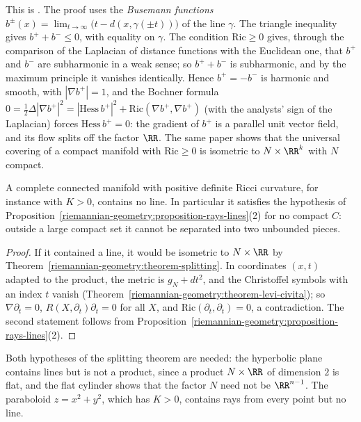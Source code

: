 This is \cite{cheeger-gromoll-1971}. The proof uses the \emph{Busemann functions} $b^\pm(x) = \lim_{t \to \infty}\bigl(t - d(x, \gamma(\pm t))\bigr)$ of the line $\gamma$. The
triangle inequality gives $b^+ + b^- \leq 0$, with equality on $\gamma$. The condition $\mathrm{Ric} \geq 0$ gives, through the comparison of the Laplacian of distance functions
with the Euclidean one, that $b^+$ and $b^-$ are subharmonic in a weak sense; so $b^+ + b^-$ is subharmonic, and by the maximum principle it vanishes identically. Hence
$b^+ = -b^-$ is harmonic and smooth, with $|\nabla b^+| = 1$, and the Bochner formula $0 = \frac12\Delta|\nabla b^+|^2 = |\mathrm{Hess}\,b^+|^2 + \mathrm{Ric}(\nabla b^+, \nabla b^+)$
(with the analysts' sign of the Laplacian) forces $\mathrm{Hess}\,b^+ = 0$: the gradient of $b^+$ is a parallel unit vector field, and its flow splits off the factor $\RR$.
The same paper shows that the universal covering of a compact manifold with $\mathrm{Ric} \geq 0$ is isometric to $N \times \RR^k$ with $N$ compact.

\begin{corollary}\label{riemannian-geometry:corollary-no-lines}
A complete connected manifold with positive definite Ricci curvature, for instance with $K > 0$, contains no line. In particular it satisfies the hypothesis of
Proposition~\ref{riemannian-geometry:proposition-rays-lines}(2) for no compact $C$: outside a large compact set it cannot be separated into two unbounded pieces.
\end{corollary}

\begin{proof}
If it contained a line, it would be isometric to $N \times \RR$ by Theorem~\ref{riemannian-geometry:theorem-splitting}. In coordinates $(x, t)$ adapted to the product, the
metric is $g_N + dt^2$, and the Christoffel symbols with an index $t$ vanish (Theorem~\ref{riemannian-geometry:theorem-levi-civita}); so $\nabla\partial_t = 0$,
$R(X, \partial_t)\partial_t = 0$ for all $X$, and $\mathrm{Ric}(\partial_t, \partial_t) = 0$, a contradiction. The second statement follows from
Proposition~\ref{riemannian-geometry:proposition-rays-lines}(2).
\end{proof}

Both hypotheses of the splitting theorem are needed: the hyperbolic plane contains lines but is not a product, since a product $N \times \RR$ of dimension $2$ is flat, and
the flat cylinder shows that the factor $N$ need not be $\RR^{n-1}$. The paraboloid $z = x^2 + y^2$, which has $K > 0$, contains rays from every point but no line.

